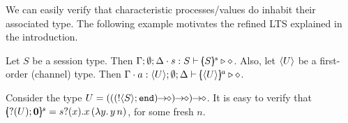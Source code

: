\noi We can easily verify that characteristic processes/values  
do inhabit  their associated type. 
The following example motivates the refined 
LTS explained in %
the introduction.

\begin{proposition}
		Let $S$ be a session type. Then $\Gamma; \emptyset; \Delta \cdot s: S \vdash [\!\!(S)\!\!]^{s} \triangleright \diamond$.
		Also, let $\langle U \rangle$ be a first-order (channel) type. Then $\Gamma \cdot a: \langle U \rangle; \emptyset; \Delta \vdash [\!\!(\langle U \rangle)\!\!]^{a} \triangleright \diamond$.
\end{proposition}



\begin{example}
	Consider the type $U = \shot{(\shot{(\shot{(\btout{S} \tinact)})})}$.
	It is easy to verify that %
	$[\!\!(? (U) ; \mathbf{0})\!\!]^{s} = s ? (x) . x\, {(\lambda y.\,y\, {n})}$, for some fresh $n$.
\end{example}



